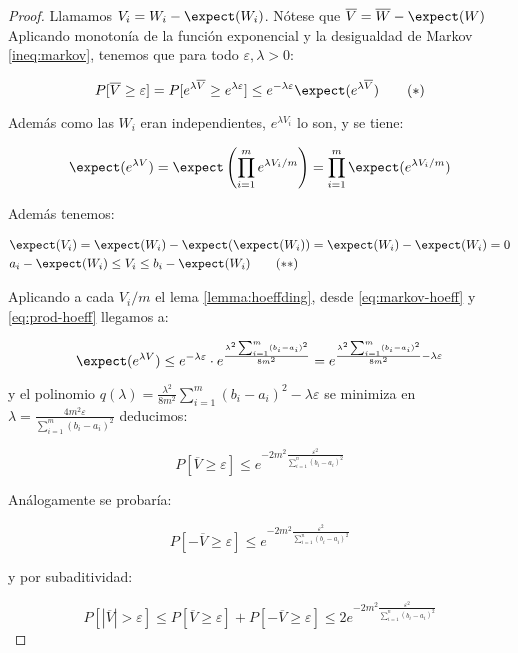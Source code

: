\begin{proof}
 Llamamos $V_i = W_i - \expect(W_i)$. Nótese que $\overline{V} = \overline{W} - \expect(W)$
 Aplicando monotonía de la función exponencial y la desigualdad de Markov \ref{ineq:markov}, tenemos que 
 para todo $\varepsilon, \lambda > 0$:
 
 \begin{equation}
 P[\overline{V} \ge \varepsilon] = P[e^{\lambda\overline{V}} \ge e^{\lambda \varepsilon}]
 \le e^{-\lambda \varepsilon} \expect(e^{\lambda \overline{V}})
 \label{eq:markov-hoeff}\tag{$\ast$}
 \end{equation}
 
 Además como las $W_i$ eran independientes, $e^{\lambda V_i}$ lo son, y se tiene:
 
 \[\expect(e^{\lambda V}) = \expect\left(\prod_{i=1}^m e^{\lambda V_i / m}\right) = \prod_{i=1}^m \expect(e^{\lambda V_i/m})\]
 
 Además tenemos:
 
 \begin{align}
  & \expect(V_i) = \expect(W_i) - \expect(\expect(W_i)) = \expect(W_i) - \expect(W_i) = 0 \nonumber \\
  & a_i-\expect(W_i) \le V_i \le b_i-\expect(W_i)
  \label{eq:prod-hoeff}\tag{$\ast\ast$}
 \end{align}
 
 Aplicando a cada $V_i/m$ el lema \ref{lemma:hoeffding}, desde \eqref{eq:markov-hoeff} y \eqref{eq:prod-hoeff} 
 llegamos a:
 
 \[\expect(e^{\lambda V}) \le e^{-\lambda \varepsilon} \cdot e^{\frac{\lambda^2 \sum_{i=1}^m(b_i-a_i)^2}{8m^2}} = 
  e^{\frac{\lambda^2 \sum_{i=1}^m(b_i-a_i)^2}{8m^2} - \lambda\varepsilon}\]
 
 y el polinomio $q(\lambda)= \frac{\lambda^2}{8m^2} \sum_{i=1}^m(b_i-a_i)^2 - \lambda\varepsilon$ se minimiza en 
 $\lambda = \frac{4m^2\varepsilon}{\sum_{i=1}^m(b_i-a_i)^2}$ deducimos:
 
 \[P[\overline{V} \ge \varepsilon] \le e^{-2m^2 \frac{\varepsilon^2}{\sum_{i=1}^n (b_i-a_i)^2}}\]
 
 Análogamente se probaría:
 
 \[P[-\overline{V} \ge \varepsilon] \le e^{-2m^2 \frac{\varepsilon^2}{\sum_{i=1}^n (b_i-a_i)^2}}\]
 
 
 y por subaditividad: 
 
 \[P[|\overline{V}| > \varepsilon] \le P[\overline{V} \ge \varepsilon] + P[-\overline{V} \ge \varepsilon]
 \le 2e^{-2m^2 \frac{\varepsilon^2}{\sum_{i=1}^n (b_i-a_i)^2}}\]
 
\end{proof}
